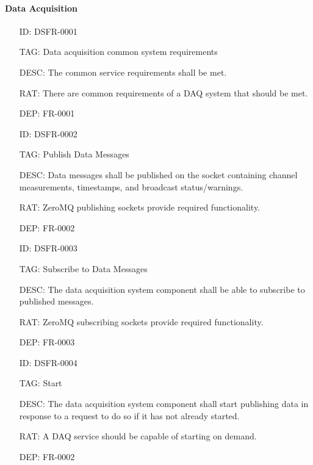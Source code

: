       \paragraph{Data Acquisition}

        \begin{itemize}
          \setlength{\itemindent}{.5in}
          \itemsep .15em
          \item[ID:] DSFR-0001
          \item[TAG:] Data acquisition common system requirements
          \item[DESC:] The common service requirements shall be met.
          \item[RAT:] There are common requirements of a DAQ system that
            should be met.
          \item[DEP:] FR-0001
        \end{itemize}

        \begin{itemize}
          \setlength{\itemindent}{.5in}
          \itemsep .15em
          \item[ID:] DSFR-0002
          \item[TAG:] Publish Data Messages
          \item[DESC:] Data messages shall be published on the socket
            containing channel measurements, timestamps, and broadcast
            status/warnings.
          \item[RAT:] ZeroMQ publishing sockets provide required functionality.
          \item[DEP:] FR-0002
        \end{itemize}

        \begin{itemize}
          \setlength{\itemindent}{.5in}
          \itemsep .15em
          \item[ID:] DSFR-0003
          \item[TAG:] Subscribe to Data Messages
          \item[DESC:] The data acquisition system component shall be able to
            subscribe to published messages.
          \item[RAT:] ZeroMQ subscribing sockets provide required functionality.
          \item[DEP:] FR-0003
        \end{itemize}

        \begin{itemize}
          \setlength{\itemindent}{.5in}
          \itemsep .15em
          \item[ID:] DSFR-0004
          \item[TAG:] Start
          \item[DESC:] The data acquisition system component shall start
            publishing data in response to a request to do so if it has not
            already started.
          \item[RAT:] A DAQ service should be capable of starting on demand.
          \item[DEP:] FR-0002
        \end{itemize}

